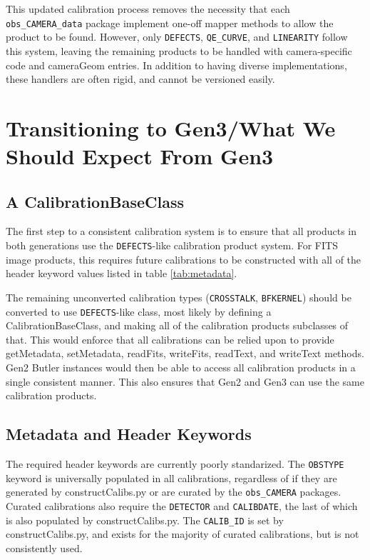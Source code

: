 \documentclass[DM,authoryear,toc]{lsstdoc}
\begin{document}
This updated calibration process removes the necessity that each
\verb|obs_CAMERA_data| package implement one-off mapper methods to allow the
product to be found.  However, only \verb|DEFECTS|, \verb|QE_CURVE|, and \verb|LINEARITY|
follow this system, leaving the remaining products to be handled with
camera-specific code and cameraGeom entries.  In addition to having
diverse implementations, these handlers are often rigid, and cannot be
versioned easily.

\section{Transitioning to Gen3/What We Should Expect From Gen3}

\subsection{A CalibrationBaseClass}
The first step to a consistent calibration system is to ensure that
all products in both generations use the \verb|DEFECTS|-like calibration
product system.  For FITS image products, this requires future
calibrations to be constructed with all of the header keyword values
listed in table \ref{tab:metadata}.

The remaining unconverted calibration types (\verb|CROSSTALK|, \verb|BFKERNEL|)
should be converted to use \verb|DEFECTS|-like class, most likely by defining
a CalibrationBaseClass, and making all of the calibration products
subclasses of that.  This would enforce that all calibrations can be
relied upon to provide getMetadata, setMetadata, readFits, writeFits,
readText, and writeText methods.  Gen2 Butler instances would then be
able to access all calibration products in a single consistent manner.
This also ensures that Gen2 and Gen3 can use the same calibration
products.

\subsection{Metadata and Header Keywords}

The required header keywords are currently poorly standarized.  The
\verb|OBSTYPE| keyword is universally populated in all calibrations,
regardless of if they are generated by constructCalibs.py or are
curated by the \verb|obs_CAMERA| packages.  Curated calibrations also
require the \verb|DETECTOR| and \verb|CALIBDATE|, the last of which is
also populated by constructCalibs.py.  The \verb|CALIB_ID| is set by
constructCalibs.py, and exists for the majority of curated
calibrations, but is not consistently used.
\end{document}
